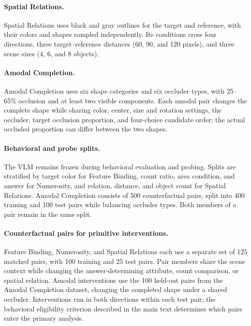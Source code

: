 \documentclass{article} %
\begin{document}
\paragraph{Spatial Relations.}
Spatial Relations uses black and gray outlines for the target and reference, with their colors and shapes sampled independently. Its conditions cross four directions, three target--reference distances (60, 90, and 120 pixels), and three scene sizes (4, 6, and 8 objects).

\paragraph{Amodal Completion.}
Amodal Completion uses six shape categories and six occluder types, with 25--65\% occlusion and at least two visible components. Each amodal pair changes the complete shape while sharing color, center, size and rotation settings, the occluder, target occlusion proportion, and four-choice candidate order; the actual occluded proportion can differ between the two shapes.

\paragraph{Behavioral and probe splits.}
The VLM remains frozen during behavioral evaluation and probing. Splits are stratified by target color for Feature Binding, count ratio, area condition, and answer for Numerosity, and relation, distance, and object count for Spatial Relations. Amodal Completion consists of 500 counterfactual pairs, split into 400 training and 100 test pairs while balancing occluder types. Both members of a pair remain in the same split.

\paragraph{Counterfactual pairs for primitive interventions.}
Feature Binding, Numerosity, and Spatial Relations each use a separate set of 125 matched pairs, with 100 training and 25 test pairs. Pair members share the scene context while changing the answer-determining attribute, count comparison, or spatial relation. Amodal interventions use the 100 held-out pairs from the Amodal Completion dataset, changing the completed shape under a shared occluder. Interventions run in both directions within each test pair; the behavioral eligibility criterion described in the main text determines which pairs enter the primary analysis.
\end{document}
